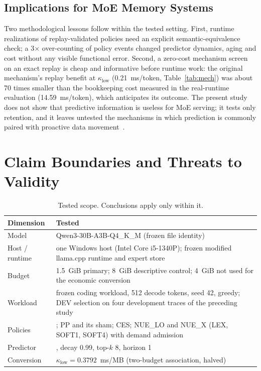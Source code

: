 \documentclass[11pt]{article}
\theoremstyle{plain}
\theoremstyle{definition}
\newcommand{\code}[1]{\texttt{\seqsplit{#1}}}
\newcommand{\klow}{\kappa_{\mathrm{low}}}
\begin{document}
\subsection{Implications for MoE Memory Systems}
Two methodological lessons follow within the tested setting. First, runtime realizations of replay-validated policies need an explicit semantic-equivalence check; a 3$\times$ over-counting of policy events changed predictor dynamics, aging and cost without any visible functional error. Second, a zero-cost mechanism screen on an exact replay is cheap and informative before runtime work: the original mechanism's replay benefit at $\klow$ (0.21~ms/token, Table~\ref{tab:mech}) was about 70 times smaller than the bookkeeping cost measured in the real-runtime evaluation (14.59~ms/token), which anticipates its outcome. The present study does not show that predictive information is useless for MoE serving; it tests only retention, and it leaves untested the mechanisms in which prediction is commonly paired with proactive data movement~\cite{promoe2025,layerscope2025,expertflow2026}.

\section{Claim Boundaries and Threats to Validity}
\label{sec:threats}

\begin{table}[t]
\centering
\caption{Tested scope. Conclusions apply only within it.}
\label{tab:scope}
\small
\begin{tabularx}{\linewidth}{lX}
\toprule
Dimension & Tested \\
\midrule
Model & Qwen3-30B-A3B-Q4\_K\_M (frozen file identity) \\
Host / runtime & one Windows host (Intel Core i5-1340P); frozen modified llama.cpp runtime and expert store \\
Budget & 1.5~GiB primary; 8~GiB descriptive control; 4~GiB not used for the economic conversion \\
Workload & frozen coding workload, 512 decode tokens, seed 42, greedy; DEV selection on four development traces of the preceding study \\
Policies & \code{b\_selected}; PP and its sham; CES; NUE\_LO and NUE\_X (LEX, SOFT1, SOFT4) with demand admission \\
Predictor & \code{decayed\_transition}, decay 0.99, top-$k$ 8, horizon 1 \\
Conversion & $\klow = 0.3792$~ms/MB (two-budget association, halved) \\
\bottomrule
\end{tabularx}
\end{table}
\end{document}
